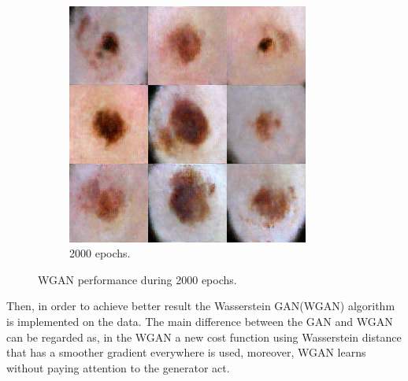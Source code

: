 \documentclass[conference]{IEEEtran}
\begin{document}
\begin{figure}
   ~
    \begin{subfigure}[b]{0.15\textwidth}
        \includegraphics[width=\textwidth]{13.png}
        \caption{2000 epochs.}
        \label{fig:9}
    \end{subfigure}
  
    
    \caption{WGAN performance during 2000 epochs.}\label{fig:GANR}
\end{figure}


Then, in order to achieve better result the Wasserstein GAN(WGAN) algorithm is implemented on the data. The main difference between the GAN and WGAN can be regarded as, in the WGAN a new cost function using Wasserstein distance that has a smoother gradient everywhere is used, moreover, WGAN learns without paying attention to the generator act. 
\end{document}
